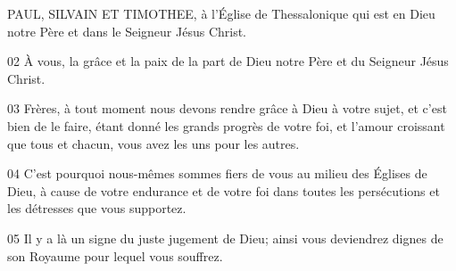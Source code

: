 PAUL, SILVAIN ET TIMOTHEE, à l’Église de Thessalonique qui est en Dieu notre Père et dans le Seigneur Jésus Christ.

02 À vous, la grâce et la paix de la part de Dieu notre Père et du Seigneur Jésus Christ.

03 Frères, à tout moment nous devons rendre grâce à Dieu à votre sujet, et c’est bien de le faire, étant donné les grands progrès de votre foi, et l’amour croissant que tous et chacun, vous avez les uns pour les autres.

04 C’est pourquoi nous-mêmes sommes fiers de vous au milieu des Églises de Dieu, à cause de votre endurance et de votre foi dans toutes les persécutions et les détresses que vous supportez.

05 Il y a là un signe du juste jugement de Dieu; ainsi vous deviendrez dignes de son Royaume pour lequel vous souffrez.
